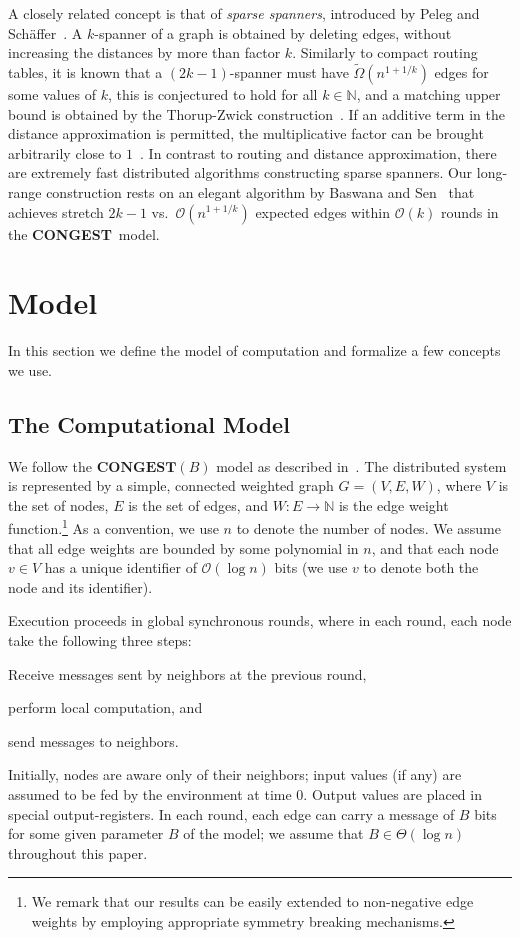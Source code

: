 \documentclass[letterpaper,11pt]{article}
\newcommand{\N}{\mathbb{N}}
\newcommand{\BO}{\mathcal{O}}
\newcommand{\CONGEST}{\textbf{CONGEST}}
\begin{document}
A closely related concept is that of \emph{sparse spanners}, introduced
by Peleg and Sch\"affer~\cite{PS89}. A $k$-spanner of a graph is obtained by
deleting edges, without increasing the distances by more than
factor $k$. Similarly to compact routing tables, it is known that a $(2k-1)$-spanner must
have $\tilde\Omega(n^{1+1/k})$ edges for some values of $k$, this is
conjectured to hold for all $k\in \N$, and a matching upper bound is obtained
by the Thorup-Zwick construction~\cite{TZ-05}. If an additive term
in the distance approximation is permitted, the multiplicative factor can be
brought arbitrarily close to $1$~\cite{EP04}. In contrast to routing and
distance approximation, there are extremely fast distributed algorithms
constructing sparse spanners.
Our long-range construction rests on an elegant
algorithm by Baswana and Sen~\cite{baswana07} that achieves stretch $2k-1$ vs.\ $\BO(n^{1+1/k})$ expected edges
within $\BO(k)$ rounds in the \CONGEST\ model. 








\section{Model}
\label{sec-model}
In this section we define the model of computation and formalize a few
concepts we use.

\subsection{The Computational Model} 
We follow the $\CONGEST(B)$ model as described in~\cite{Peleg:book}. The 
distributed system is represented by a simple, connected weighted
graph $G=(V,E,W)$, where $V$ is the set of nodes, $E$ is the set of
edges, and $W:E\to\N$ is the edge weight function.\footnote{We remark
that our results can be easily extended to non-negative edge weights by
employing appropriate symmetry breaking mechanisms.}
As a convention, we use $n$ to denote the number of nodes. We assume that all
edge weights are bounded by some polynomial in $n$, and that each node $v\in V$
has a unique identifier of $\BO(\log n)$ bits (we use $v$ to denote both the
node and its identifier).

Execution proceeds in global synchronous rounds, where
in each round, each node take the following three steps:
\begin{inparaenum}[(1)]
\item Receive messages sent by neighbors at the previous round,
\item perform local computation, and
\item send messages to neighbors.
\end{inparaenum}
Initially, nodes are aware only of their neighbors; input values (if any) are
assumed to be fed by the environment at time $0$. Output values are placed in
special output-registers. In each round, each edge can carry a message of $B$
bits for some given parameter $B$ of the model; we assume that $B\in \Theta(\log
n)$ throughout this paper.
\end{document}
